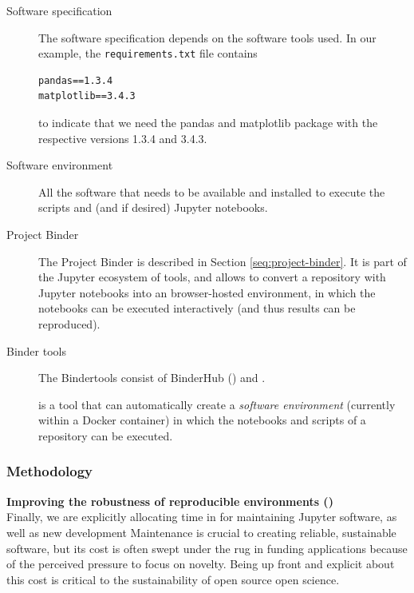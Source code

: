 \begin{description}
\item[Software specification] The software specification depends on the software
  tools used. In our example, the \texttt{requirements.txt} file contains
\begin{verbatim}
pandas==1.3.4
matplotlib==3.4.3
\end{verbatim}
to indicate that we need the pandas and matplotlib package with the respective
versions 1.3.4 and 3.4.3.

\item[Software environment] All the software that needs to be available and
  installed to execute the scripts and (and if desired) Jupyter notebooks.

\item[Project Binder] The Project Binder is described in Section
\ref{seq:project-binder}. It is part of the Jupyter ecosystem of tools, and
allows to convert a repository with Jupyter notebooks into an browser-hosted
environment, in which the notebooks can be executed interactively (and thus
results can be reproduced). 

\item[Binder tools] The Bindertools consist of BinderHub () and
\repotodocker{}. 

\item[\repotodocker] \repotodocker{} is a tool that can automatically create a
\emph{software environment} (currently within a Docker container) in which the
notebooks and scripts of a repository can be executed. 
\end{description}




\subsubsection{Methodology}\label{sec:methodology}

\textbf{Improving the robustness of reproducible environments ()}\\
Finally, we are explicitly allocating time in  for maintaining
Jupyter software, as well as new development
Maintenance is crucial to creating reliable, sustainable software,
but its cost is often swept under the rug in funding applications
because of the perceived pressure to focus on novelty.
Being up front and explicit about this cost is critical to the sustainability
of open source open science.

